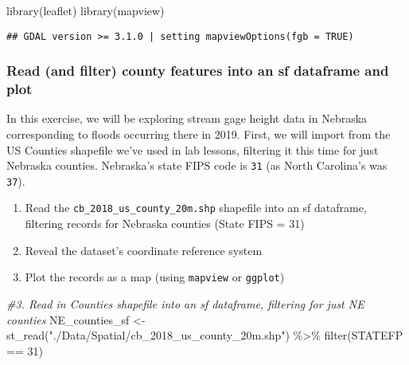 \documentclass[
]{article}
\newenvironment{Shaded}{\begin{snugshade}}{\end{snugshade}}
\newcommand{\CommentTok}[1]{\textcolor[rgb]{0.56,0.35,0.01}{\textit{#1}}}
\newcommand{\DecValTok}[1]{\textcolor[rgb]{0.00,0.00,0.81}{#1}}
\newcommand{\FunctionTok}[1]{\textcolor[rgb]{0.00,0.00,0.00}{#1}}
\newcommand{\NormalTok}[1]{#1}
\newcommand{\OtherTok}[1]{\textcolor[rgb]{0.56,0.35,0.01}{#1}}
\newcommand{\SpecialCharTok}[1]{\textcolor[rgb]{0.00,0.00,0.00}{#1}}
\newcommand{\StringTok}[1]{\textcolor[rgb]{0.31,0.60,0.02}{#1}}
\providecommand{\tightlist}{%
  \setlength{\itemsep}{0pt}\setlength{\parskip}{0pt}}
\begin{document}
\begin{Shaded}
\begin{Highlighting}[]
\FunctionTok{library}\NormalTok{(leaflet)}
\FunctionTok{library}\NormalTok{(mapview)}
\end{Highlighting}
\end{Shaded}

\begin{verbatim}
## GDAL version >= 3.1.0 | setting mapviewOptions(fgb = TRUE)
\end{verbatim}

\hypertarget{read-and-filter-county-features-into-an-sf-dataframe-and-plot}{%
\subsubsection{Read (and filter) county features into an sf dataframe
and
plot}\label{read-and-filter-county-features-into-an-sf-dataframe-and-plot}}

In this exercise, we will be exploring stream gage height data in
Nebraska corresponding to floods occurring there in 2019. First, we will
import from the US Counties shapefile we've used in lab lessons,
filtering it this time for just Nebraska counties. Nebraska's state FIPS
code is \texttt{31} (as North Carolina's was \texttt{37}).

\begin{enumerate}
\def\labelenumi{\arabic{enumi}.}
\setcounter{enumi}{2}
\tightlist
\item
  Read the \texttt{cb\_2018\_us\_county\_20m.shp} shapefile into an sf
  dataframe, filtering records for Nebraska counties (State FIPS = 31)
\item
  Reveal the dataset's coordinate reference system
\item
  Plot the records as a map (using \texttt{mapview} or \texttt{ggplot})
\end{enumerate}

\begin{Shaded}
\begin{Highlighting}[]
\CommentTok{\#3. Read in Counties shapefile into an sf dataframe, filtering for just NE counties}
\NormalTok{NE\_counties\_sf }\OtherTok{\textless{}{-}} \FunctionTok{st\_read}\NormalTok{(}\StringTok{"./Data/Spatial/cb\_2018\_us\_county\_20m.shp"}\NormalTok{) }\SpecialCharTok{\%\textgreater{}\%}
                  \FunctionTok{filter}\NormalTok{(STATEFP }\SpecialCharTok{==} \DecValTok{31}\NormalTok{)}
\end{Highlighting}
\end{Shaded}
\end{document}
